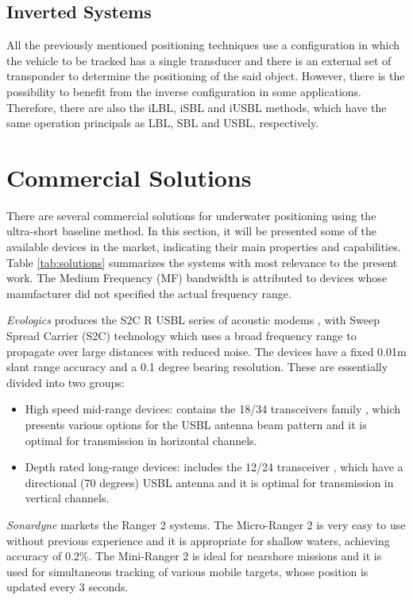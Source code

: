\subsection{Inverted Systems}

All the previously mentioned positioning techniques use a configuration in which the vehicle to be tracked has a single transducer and there is an external set of transponder to determine the positioning of the said object. However, there is the possibility to benefit from the inverse configuration in some applications. Therefore, there are also the iLBL, iSBL and iUSBL methods, which have the same operation principals as LBL, SBL and USBL, respectively.



\section{Commercial Solutions}

There are several commercial solutions for underwater positioning using the ultra-short baseline method. In this section, it will be presented some of the available devices in the market, indicating their main properties and capabilities. Table \ref{tab:solutions} summarizes the systems with most relevance to the present work. The Medium Frequency (MF) bandwidth is attributed to devices whose manufacturer did not specified the actual frequency range.

\textit{Evologics} produces the S2C R USBL series of acoustic modems \cite{evologics1}, with Sweep Spread Carrier (S2C) technology \cite{evologics2} which uses a broad frequency range to propagate over large distances with reduced noise. The devices have a fixed 0.01m slant range accuracy and a 0.1 degree bearing resolution. These are essentially divided into two groups:
\begin{itemize}
	\item High speed mid-range devices: contains the 18/34 transceivers family \cite{evologics3}, which presents various options for the USBL antenna beam pattern and it is optimal for transmission in horizontal channels.
	\item Depth rated long-range devices: includes the 12/24 transceiver \cite{evologics4}, which have a directional (70 degrees) USBL antenna  and it is optimal for transmission in vertical channels.
\end{itemize}

\textit{Sonardyne} markets the Ranger 2 systems. The Micro-Ranger 2 \cite{sonardyne1} is very easy to use without previous experience and it is appropriate for shallow waters, achieving accuracy of 0.2\%. The Mini-Ranger 2 is ideal for nearshore missions and it is  used for simultaneous tracking of various mobile targets, whose position is updated every 3 seconds.

